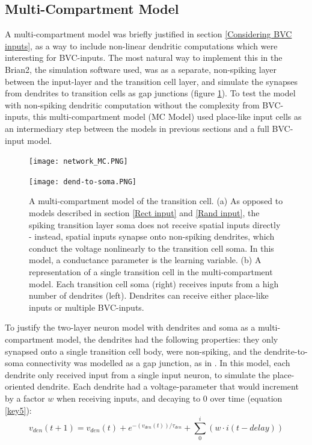 \documentclass{article}
\begin{document}
    \subsection{Multi-Compartment Model} \label{MC Model}
    A multi-compartment model was briefly justified in section \ref{Considering BVC inputs}, as a way to include non-linear dendritic computations which were interesting for BVC-inputs. The most natural way to implement this in the Brian2, the simulation software used, was as a separate, non-spiking layer between the input-layer and the transition cell layer, and simulate the synapses from dendrites to transition cells as gap junctions (figure \ref{network_MC}). To test the model with non-spiking dendritic computation without the complexity from BVC-inputs, this multi-compartment model (MC Model) used place-like input cells as an intermediary step between the models in previous sections and a full BVC-input model.

    \begin{figure}[h]
        \begin{minipage}[b]{\textwidth}
            \subcaption{}
            \texttt{[image: network\_MC.PNG]}
        \end{minipage}
        \begin{minipage}[t]{0.35\textwidth}
            \subcaption{}
            \texttt{[image: dend-to-soma.PNG]}
        \end{minipage}
        \hspace{0.1\textwidth}
        \begin{minipage}[t]{0.54\textwidth}
            \caption{A multi-compartment model of the transition cell. (a) As opposed to models described in section \ref{Rect input} and \ref{Rand input}, the spiking transition layer soma does not receive spatial inputs directly - instead, spatial inputs synapse onto non-spiking dendrites, which conduct the voltage nonlinearly to the transition cell soma. In this model, a conductance parameter is the learning variable. (b) A representation of a single transition cell in the multi-compartment model. Each transition cell soma (right) receives inputs from a high number of dendrites (left). Dendrites can receive either place-like inputs or multiple BVC-inputs.}
            \label{network_MC}
        \end{minipage}
    \end{figure}

    To justify the two-layer neuron model with dendrites and soma as a multi-compartment model, the dendrites had the following properties: they only synapsed onto a single transition cell body, were non-spiking, and the dendrite-to-soma connectivity was modelled as a gap junction, as in \parencite{Alabi2022}. In this model, each dendrite only received input from a single input neuron, to simulate the place-oriented dendrite. Each dendrite had a voltage-parameter that would increment by a factor \(w\) when receiving inputs, and decaying to 0 over time (equation \ref{key5}):
        \begin{equation}\label{key5} v_{den}(t + 1) = v_{den}(t) + e^{-(v_{den}(t))/\tau_{den}} + \sum_{0}^{i} (w \cdot i(t-delay)) \end{equation}
    
\end{document}

